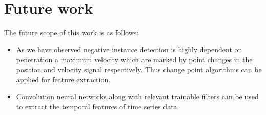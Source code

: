     \section{Future work}
    The future scope of this work is as follows:
    \begin{itemize}
    	\item As we have observed negative instance detection is highly dependent on penetration a maximum velocity which are marked by point changes in the position and velocity signal respectively. Thus change point algorithms can be applied for feature extraction.
    	\item Convolution neural networks along with relevant trainable filters can be used to extract the temporal features of time series data. 
    
    \end{itemize}

